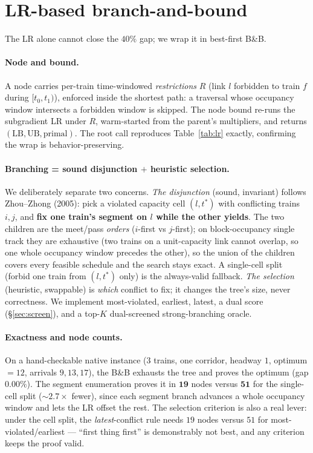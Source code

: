 \documentclass[11pt]{article}
\begin{document}
\section{LR-based branch-and-bound}\label{sec:bnb}
The LR alone cannot close the $40\%$ gap; we wrap it in best-first B\&B.

\paragraph{Node and bound.} A node carries per-train time-windowed \emph{restrictions}
$R$ (link $l$ forbidden to train $f$ during $[t_0,t_1)$), enforced inside the shortest path:
a traversal whose occupancy window intersects a forbidden window is skipped. The node bound
re-runs the subgradient LR under $R$, warm-started from the parent's multipliers, and returns
$(\mathrm{LB}, \mathrm{UB}, \text{primal})$. The root call reproduces Table~\ref{tab:lr}
exactly, confirming the wrap is behavior-preserving.

\paragraph{Branching = sound disjunction $+$ heuristic selection.} We deliberately separate
two concerns.
\emph{The disjunction} (sound, invariant) follows Zhou--Zhong (2005): pick a violated
capacity cell $(l,t^*)$ with conflicting trains $i,j$, and \textbf{fix one train's segment on
$l$ while the other yields}. The two children are the meet/pass \emph{orders} ($i$-first vs
$j$-first); on block-occupancy single track they are exhaustive (two trains on a unit-capacity
link cannot overlap, so one whole occupancy window precedes the other), so the union of the
children covers every feasible schedule and the search stays exact. A single-cell split
(forbid one train from $(l,t^*)$ only) is the always-valid fallback.
\emph{The selection} (heuristic, swappable) is \emph{which} conflict to fix; it changes the
tree's size, never correctness. We implement most-violated, earliest, latest, a dual score
(\S\ref{sec:screen}), and a top-$K$ dual-screened strong-branching oracle.

\paragraph{Exactness and node counts.} On a hand-checkable native instance ($3$ trains, one
corridor, headway $1$, optimum $=12$, arrivals $9,13,17$), the B\&B exhausts the tree and
proves the optimum (gap $0.00\%$). The segment enumeration proves it in $\mathbf{19}$ nodes
versus $\mathbf{51}$ for the single-cell split ($\sim\!2.7\times$ fewer), since each segment
branch advances a whole occupancy window and lets the LR offset the rest. The selection
criterion is also a real lever: under the cell split, the \emph{latest}-conflict rule needs
$19$ nodes versus $51$ for most-violated/earliest --- ``first thing first'' is demonstrably
not best, and any criterion keeps the proof valid.
\end{document}
